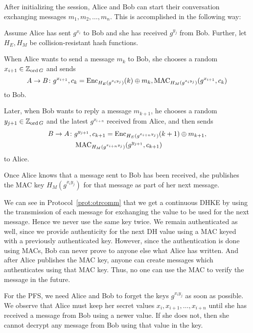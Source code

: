 After initializing the session, Alice and Bob can start their conversation 
exchanging messages \(m_1, m_2, \ldots, m_n\).
This is accomplished in the following way:

\begin{protocol}\label{prot:otrcomm}
  Assume Alice has sent \(g^{x_i}\) to Bob and she has received \(g^{y_j}\) 
  from Bob.
  Further, let \(H_E, H_M\) be collision-resistant hash functions.

  When Alice wants to send a message \(m_k\) to Bob, she chooses a random 
  \(x_{i+1}\in\mathbb Z_{\operatorname{ord} G}\) and sends
  \begin{equation*}
    A\to B\colon g^{x_{i+1}},
    c_k = \operatorname{\mathrm{Enc}}_{H_E( g^{x_i y_j} )}( k )\oplus m_k,
    \operatorname{\mathrm{MAC}}_{H_M( g^{x_i y_j} )}( g^{x_{i+1}}, c_k )
  \end{equation*}
  to Bob.

  Later, when Bob wants to reply a message \(m_{k+1}\), he chooses a random 
  \(y_{j+1}\in\mathbb Z_{\operatorname{ord} G}\) and the latest \(g^{x_{i+n}}\) received from Alice, 
  and then sends
  \begin{align*}
    B\to A\colon& g^{y_{j+1}}, c_{k+1} = \operatorname{\mathrm{Enc}}_{H_E( g^{x_{i+n} y_j} )}( k+1 
    )\oplus m_{k+1}, \\
    & \operatorname{\mathrm{MAC}}_{H_M( g^{x_{i+n} y_j} )}( g^{y_{j+1}}, c_{k+1} )
  \end{align*}
  to Alice.

  Once Alice knows that a message sent to Bob has been received, she publishes 
  the \ac{MAC} key \( H_M( g^{x_i y_j} ) \) for that message as part of her 
  next message.
\end{protocol}

We can see in Protocol~\ref{prot:otrcomm} that we get a continuous \ac{DHKE} 
by using the transmission of each message for exchanging the value to be used 
for the next message.
Hence we never use the same key twice.
We remain authenticated as well, since we provide authenticity for the next 
\ac{DH} value using a \ac{MAC} keyed with a previously authenticated key.
However, since the authentication is done using \acp{MAC}, Bob can never 
prove to anyone else what Alice has written.
And after Alice publishes the \ac{MAC} key, anyone can create messages which 
authenticates using that \ac{MAC} key.
Thus, no one can use the \ac{MAC} to verify the message in the future.

For the \ac{PFS}, we need Alice and Bob to forget the keys \(g^{x_i y_j}\) as 
soon as possible.
We observe that Alice must keep her secret values \(x_i, x_{i+1}, \ldots, 
x_{i+n}\) until she has received a message from Bob using a newer value.
If she does not, then she cannot decrypt any message from Bob using that value 
in the key.


